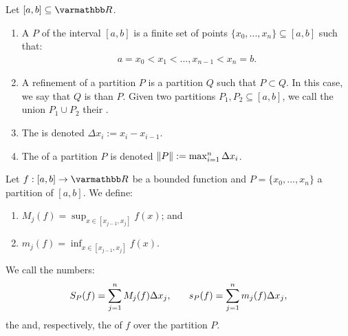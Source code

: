     \begin{definition}
        Let $[a,b] \subseteq \bfR$.
        \begin{enumerate}[label = (\arabic*),itemsep=1pt,topsep=3pt]
            \item A  $P$ of the interval $[a,b]$ is a finite set of points $\{x_0,...,x_n\} \subseteq [a,b]$ such that:
                \begin{equation*}
                \begin{split}
                    a = x_0 < x_1 < ... , x_{n-1} < x_n = b.
                \end{split}
                \end{equation*}
            \item A refinement of a partition $P$ is a partition $Q$ such that $P \subset Q$. In this case, we say that $Q$ is  than $P$. Given two partitions $P_1,P_2 \subseteq [a,b]$, we call the union $P_1 \cup P_2$ their .
            \item The  is denoted $\Delta x_i := x_{i} - x_{i-1}$.
            \item The  of a partition $P$ is denoted $\left\lVert P \right\rVert := \max_{i = 1}^n \Delta x_i$.
        \end{enumerate}
    \end{definition}

    \begin{definition}
        Let $f:[a,b] \rightarrow \bfR$ be a bounded function and $P=\{x_0,...,x_n\}$ a partition of $[a,b]$. We define:
            \begin{enumerate}[label = (\arabic*),itemsep=1pt,topsep=3pt]
                \item $M_j(f) = \sup_{x \in [x_{j-1},x_j]}f(x)$; and
                \item $m_j(f) = \inf_{x \in [x_{j-1},x_j]}f(x)$.
            \end{enumerate}
        We call the numbers:
            \begin{equation*}
            \begin{split}
                S_P(f) = \sum_{j = 1}^n M_j(f)\Delta x_j, \h9\h9 s_P(f) = \sum_{j = 1}^n m_j(f)\Delta x_j, 
            \end{split}
            \end{equation*}
        the  and, respectively, the  of $f$ over the partition $P$.
    \end{definition}

